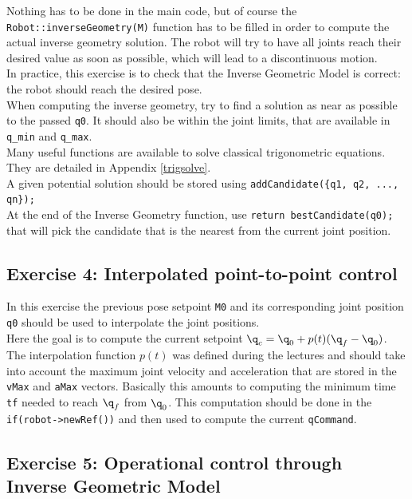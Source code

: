 \documentclass{ecnreport}
\begin{document}
Nothing has to be done in the main code, but of course the \texttt{Robot::inverseGeometry(M)} function has to be filled in order to compute the actual inverse geometry solution. The robot will try to have all joints reach their desired value as soon as possible, which will lead to a discontinuous motion.\\

In practice, this exercise is to check that the Inverse Geometric Model is correct: the robot should reach the desired pose.\\

When computing the inverse geometry, try to find a solution as near as possible to the passed \texttt{q0}. It should also be within the joint limits, that are available in \texttt{q\_min} and \texttt{q\_max}.\\

Many useful functions are available to solve classical trigonometric equations. They are detailed in Appendix \ref{trigsolve}.\\

A given potential solution should be stored using \texttt{addCandidate(\{q1, q2, ..., qn\});}\\ At the end of the Inverse Geometry function, use \texttt{return bestCandidate(q0);} that will pick the candidate that is the nearest from the current joint position.

\subsection*{Exercise 4: Interpolated point-to-point control}

In this exercise the previous pose setpoint \texttt{M0} and its corresponding joint position \texttt{q0} should be used to interpolate the joint positions.\\

Here the goal is to compute the current setpoint $\q_c = \q_0 + p(t)(\q_f-\q_0)$. The interpolation function $p(t)$ was defined during the lectures and should take into account the maximum joint velocity and acceleration that are stored in the \texttt{vMax} and \texttt{aMax} vectors. Basically this amounts to computing the minimum time \texttt{tf} needed to reach $\q_f$ from $\q_0$. This computation should be done in the \texttt{if(robot->newRef())} and then used to compute the current \texttt{qCommand}.


\subsection*{Exercise 5: Operational control through Inverse Geometric Model}
\end{document}
